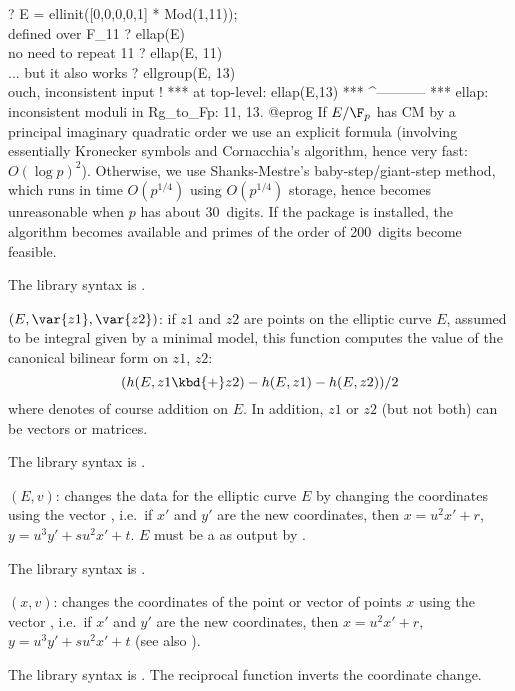 ? E = ellinit([0,0,0,0,1] * Mod(1,11));  \\ defined over F_11
? ellap(E)       \\ no need to repeat 11
? ellap(E, 11)   \\ ... but it also works
? ellgroup(E, 13) \\ ouch, inconsistent input !
   ***   at top-level: ellap(E,13)
   ***                 ^-----------
   *** ellap: inconsistent moduli in Rg_to_Fp: 11, 13.
@eprog
 If $E/\F_p$ has CM by a principal imaginary
quadratic order we use an explicit formula (involving essentially Kronecker
symbols and Cornacchia's algorithm, hence very fast: $O(\log p)^2$).
Otherwise, we use Shanks-Mestre's baby-step/giant-step method, which runs in
time $O(p^{1/4})$ using $O(p^{1/4})$ storage, hence becomes unreasonable when
$p$ has about 30~digits. If the  package is installed, the
 algorithm becomes available and primes of the order of 200~digits
become feasible.

The library syntax is .

$(E,\var{z1},\var{z2})$: \label{se:ellbil}
if $z1$ and $z2$ are points on the elliptic
curve $E$, assumed to be integral given by a minimal model, this function
computes the value of the canonical bilinear form on $z1$, $z2$:
$$ ( h(E,z1\kbd{+}z2) - h(E,z1) - h(E,z2) ) / 2 $$
where \kbd{+} denotes of course addition on $E$. In addition, $z1$ or $z2$
(but not both) can be vectors or matrices.

The library syntax is .

$(E,v)$: \label{se:ellchangecurve}
changes the data for the elliptic curve $E$
by changing the coordinates using the vector , i.e.~if $x'$
and $y'$ are the new coordinates, then $x=u^2x'+r$, $y=u^3y'+su^2x'+t$.
$E$ must be a  as output by .

The library syntax is .

$(x,v)$: \label{se:ellchangepoint}
changes the coordinates of the point or
vector of points $x$ using the vector , i.e.~if $x'$ and
$y'$ are the new coordinates, then $x=u^2x'+r$, $y=u^3y'+su^2x'+t$ (see also
).

The library syntax is .
The reciprocal function 
inverts the coordinate change.

